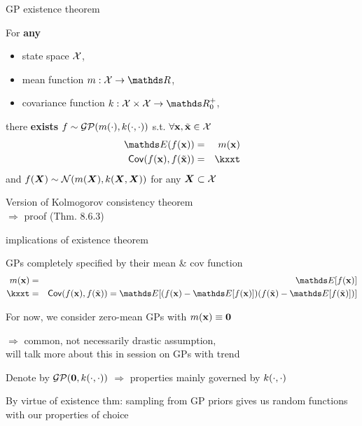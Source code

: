 \documentclass[11pt,compress,t,notes=noshow, xcolor=table]{beamer}
\begin{document}

\begin{framei}[sep=L]{GP existence theorem}
\item For \textbf{any} 
\begin{itemize}
\item state space $\mathcal{X}$,
\item mean function $m: \Xspace \rightarrow \R$,
\item covariance function $k: \Xspace \times \Xspace \rightarrow \R^+_0$, 
\end{itemize}
\vfill
there \textbf{exists} $f \sim \mathcal{GP}(m(\cdot), k(\cdot, \cdot))$ s.t. $\forall \mathbf{x}, \tilde{\mathbf{x}} \in \mathcal{X}$
\begin{eqnarray*}
\E(\fx) &=& m(\xv) \\
\cov(\fx, f(\xtil)) &=& \kxxt
\end{eqnarray*}
and $f(\bm{X}) \sim \mathcal{N}(m(\bm{X}), k(\bm{X}, \bm{X}))$ for any $\bm{X} \subset \mathcal{X}$
\item Version of Kolmogorov consistency theorem \\$\Rightarrow$ proof  (Thm. 8.6.3)
\end{framei}

\begin{framei}[sep=L]{implications of existence theorem}
\item GPs completely specified by their mean \& cov function
\begin{eqnarray*}
m(\xv) &=& \E[f(\xv)] \\
\kxxt &=& \cov(\fx, f(\xtil)) = \E [( f(\xv) - \E[f(\xv)]) ( f(\xtil) - \E[f(\xtil)] )]
\end{eqnarray*}
\item For now, we consider zero-mean GPs with $m(\mathbf{x}) \equiv \mathbf{0}$ 

$\Rightarrow$ common, not necessarily drastic assumption,\\
will talk more about this in session on GPs with trend
\item Denote by $\mathcal{GP}(\mathbf{0}, k(\cdot, \cdot))$ $\Rightarrow$ properties mainly governed by $k(\cdot, \cdot)$
\item By virtue of existence thm: sampling from GP priors gives us random functions with our properties of choice
\end{framei}
\end{document}

